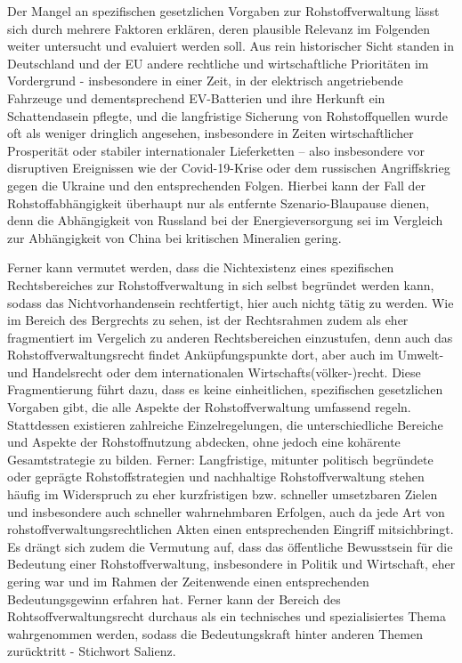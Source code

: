 \documentclass[12pt,a4paper,oneside]{book} %
\begin{document}
Der Mangel an spezifischen gesetzlichen Vorgaben zur Rohstoffverwaltung lässt sich durch mehrere Faktoren erklären, deren plausible Relevanz im Folgenden weiter untersucht und evaluiert werden soll. Aus rein historischer Sicht standen in Deutschland und der EU andere rechtliche und wirtschaftliche Prioritäten im Vordergrund - insbesondere in einer Zeit, in der elektrisch angetriebende Fahrzeuge und dementsprechend EV-Batterien und ihre Herkunft ein Schattendasein pflegte, und die langfristige Sicherung von Rohstoffquellen wurde oft als weniger dringlich angesehen, insbesondere in Zeiten wirtschaftlicher Prosperität oder stabiler internationaler Lieferketten – also insbesondere vor disruptiven Ereignissen wie der Covid-19-Krise oder dem russischen Angriffskrieg gegen die Ukraine und den entsprechenden Folgen. Hierbei kann der Fall der Rohstoffabhängigkeit überhaupt nur als entfernte Szenario-Blaupause dienen, denn die Abhängigkeit von Russland bei der Energieversorgung sei im Vergleich zur Abhängigkeit von China bei kritischen Mineralien gering.\autocite{Rachman, FT}


Ferner kann vermutet werden, dass die Nichtexistenz eines spezifischen Rechtsbereiches zur Rohstoffverwaltung in sich selbst begründet werden kann, sodass das Nichtvorhandensein rechtfertigt, hier auch nichtg tätig zu werden. Wie im Bereich des Bergrechts zu sehen, ist der Rechtsrahmen zudem als eher fragmentiert im Vergelich zu anderen Rechtsbereichen einzustufen, denn auch das Rohstoffverwaltungsrecht findet Anküpfungspunkte dort, aber auch im Umwelt- und Handelsrecht oder dem internationalen Wirtschafts(völker-)recht. Diese Fragmentierung führt dazu, dass es keine einheitlichen, spezifischen gesetzlichen Vorgaben gibt, die alle Aspekte der Rohstoffverwaltung umfassend regeln. Stattdessen existieren zahlreiche Einzelregelungen, die unterschiedliche Bereiche und Aspekte der Rohstoffnutzung abdecken, ohne jedoch eine kohärente Gesamtstrategie zu bilden.
Ferner: Langfristige, mitunter politisch begründete oder geprägte Rohstoffstrategien und nachhaltige Rohstoffverwaltung stehen häufig im Widerspruch zu eher kurzfristigen bzw. schneller umsetzbaren Zielen und insbesondere auch schneller wahrnehmbaren Erfolgen, auch da jede Art von rohstoffverwaltungsrechtlichen Akten einen entsprechenden Eingriff mitsichbringt. 
Es drängt sich zudem die Vermutung auf, dass das öffentliche Bewusstsein für die Bedeutung einer Rohstoffverwaltung, insbesondere in Politik und Wirtschaft, eher gering war und im Rahmen der Zeitenwende einen entsprechenden Bedeutungsgewinn erfahren hat. Ferner kann der Bereich des Rohtsoffverwaltungsrecht durchaus als ein technisches und spezialisiertes Thema wahrgenommen werden, sodass die Bedeutungskraft hinter anderen Themen zurücktritt - Stichwort Salienz.
\end{document}
